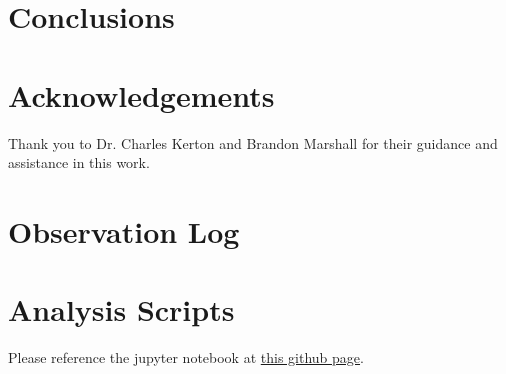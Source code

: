 \documentclass[%
aip,
jmp,
reprint,
floatfix,
nofootinbib
]{revtex4-1}
\begin{document}
	
	\section{Conclusions}
	
	
	
	\section*{Acknowledgements}
	
	Thank you to Dr. Charles Kerton and Brandon Marshall for their guidance and assistance in this work.
	
	\medskip
	
	
	
	
	\onecolumngrid
	\appendix
	\section{Observation Log}

	\begin{table}[h!]
		\centering
		
		\label{table:log1}
	\end{table}

	\begin{table}[h!]
		\centering
		
		\label{table:log2}
	\end{table}
	
	\section{Analysis Scripts}
	
	Please reference the jupyter notebook at \href{https://github.com/mileslucas/astro344l/blob/master/project/src/project.ipynb}{this github page}.
\end{document}
